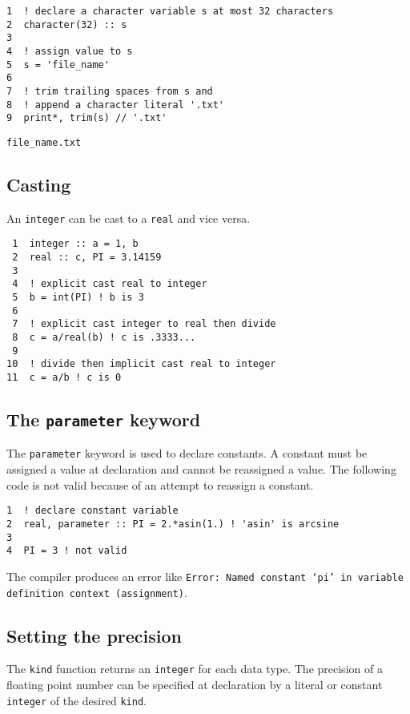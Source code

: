 \documentclass[11pt]{article}
\begin{document}
\begin{verbatim}
1  ! declare a character variable s at most 32 characters
2  character(32) :: s
3  
4  ! assign value to s
5  s = 'file_name'
6  
7  ! trim trailing spaces from s and
8  ! append a character literal '.txt'
9  print*, trim(s) // '.txt'
\end{verbatim}

\begin{verbatim}
file_name.txt
\end{verbatim}

\subsection{Casting}
\label{sec:orgheadline16}
An \texttt{integer} can be cast to a \texttt{real} and vice versa.

\begin{verbatim}
 1  integer :: a = 1, b
 2  real :: c, PI = 3.14159
 3  
 4  ! explicit cast real to integer
 5  b = int(PI) ! b is 3
 6  
 7  ! explicit cast integer to real then divide
 8  c = a/real(b) ! c is .3333...
 9  
10  ! divide then implicit cast real to integer
11  c = a/b ! c is 0
\end{verbatim}

\subsection{The \texttt{parameter} keyword}
\label{sec:orgheadline17}
The \texttt{parameter} keyword is used to declare constants. A constant must be assigned a value at declaration and cannot be reassigned a value. The following code is not valid because of an attempt to reassign a constant.

\begin{verbatim}
1  ! declare constant variable
2  real, parameter :: PI = 2.*asin(1.) ! 'asin' is arcsine
3  
4  PI = 3 ! not valid
\end{verbatim}

The compiler produces an error like \texttt{Error: Named constant ‘pi’ in variable definition context (assignment)}.

\subsection{Setting the precision}
\label{sec:orgheadline18}
The \texttt{kind} function returns an \texttt{integer} for each data type. The precision of a floating point number can be specified at declaration by a literal or constant \texttt{integer} of the desired \texttt{kind}.
\end{document}
